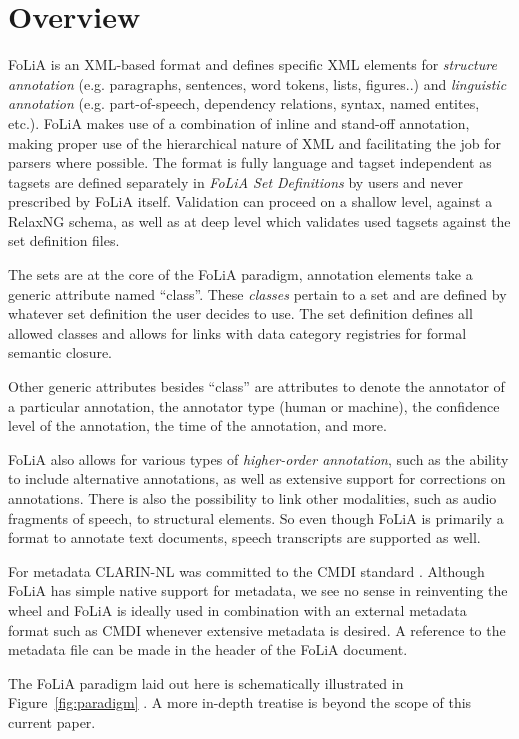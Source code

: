 \documentclass[a4paper,11pt]{article}
\begin{document}
\section{Overview}
\label{sec:overview}

FoLiA is an XML-based format and defines specific XML elements for \emph{structure
annotation} (e.g. paragraphs, sentences, word tokens, lists, figures..) and
\emph{linguistic annotation} (e.g. part-of-speech, dependency relations,
syntax, named entites, etc.). FoLiA makes use of a combination of inline and
stand-off annotation, making proper use of the hierarchical nature of XML and
facilitating the job for parsers where possible. The format is fully language and
tagset independent as tagsets are defined separately in \emph{FoLiA Set Definitions}
by users and never prescribed by FoLiA itself. Validation can proceed
on a shallow level, against a RelaxNG schema, as well as at deep level which
validates used tagsets against the set definition files.

The sets are at the core of the FoLiA paradigm, annotation elements take a
generic attribute named ``class''. These \emph{classes} pertain to a set and are
defined by whatever set definition the user decides to use. The set definition
defines all allowed classes and allows for links with data category registries
for formal semantic closure.

Other generic attributes besides ``class'' are attributes to denote the
annotator of a particular annotation, the annotator type (human or machine),
the confidence level of the annotation, the time of the annotation, and more.

FoLiA also allows for various types of \emph{higher-order annotation}, such as
the ability to include alternative annotations, as well as extensive support
for corrections on annotations. There is also the possibility to link other
modalities, such as audio fragments of speech, to structural elements. So even
though FoLiA is primarily a format to annotate text documents, speech
transcripts are supported as well. 

For metadata CLARIN-NL was committed to the CMDI standard \cite{CMDI}.
Although FoLiA has simple native support for metadata, we see no
sense in reinventing the wheel and FoLiA is ideally used in combination with an
external metadata format such as CMDI whenever extensive metadata is desired. A
reference to the metadata file can be made in the header of the FoLiA document.

The FoLiA paradigm laid out here is schematically illustrated in
Figure~\ref{fig:paradigm} \cite{FOLIADOC2014}. A more in-depth treatise is beyond the scope of this
current paper.
\end{document}
